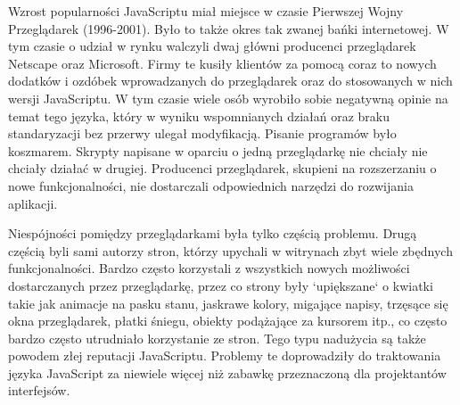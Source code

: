 Wzrost popularności JavaScriptu miał miejsce w czasie Pierwszej Wojny Przeglądarek (1996-2001)\cite{stefanov10}. Było to także okres tak zwanej bańki internetowej. W tym czasie o udział w rynku walczyli dwaj główni producenci przeglądarek Netscape oraz Microsoft. Firmy te kusiły klientów za pomocą coraz to nowych dodatków i ozdóbek wprowadzanych do przeglądarek oraz do stosowanych w nich wersji JavaScriptu. W tym czasie wiele osób wyrobiło sobie negatywną opinie na temat tego języka, który w wyniku wspomnianych działań oraz braku standaryzacji bez przerwy ulegał modyfikacją. Pisanie programów było koszmarem. Skrypty napisane w oparciu o jedną przeglądarkę nie chciały nie chciały działać w drugiej. Producenci przeglądarek, skupieni na rozszerzaniu o nowe funkcjonalności, nie dostarczali odpowiednich narzędzi do rozwijania aplikacji\cite{stefanov10}.

Niespójności pomiędzy przeglądarkami była tylko częścią problemu. Drugą częścią byli sami autorzy stron, którzy upychali w witrynach zbyt wiele zbędnych funkcjonalności. Bardzo często korzystali z wszystkich nowych możliwości dostarczanych przez przeglądarkę, przez co strony były `upiększane` o kwiatki takie jak animacje na pasku stanu, jaskrawe kolory, migające napisy, trzęsące się okna przeglądarek, płatki śniegu, obiekty podążające za kursorem itp., co często bardzo często utrudniało korzystanie ze stron. Tego typu nadużycia są także powodem złej reputacji JavaScriptu. Problemy te doprowadziły do traktowania języka JavaScript za niewiele więcej niż zabawkę przeznaczoną dla projektantów interfejsów. 


